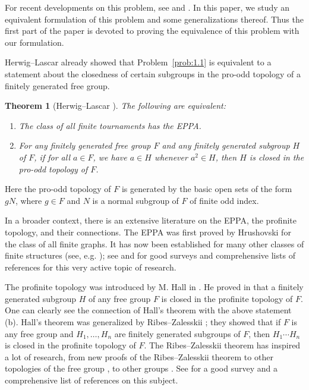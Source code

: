 \documentclass[10pt,a4paper]{amsart}
\newtheorem{theorem}{Theorem}[section]
\theoremstyle{definition}
\theoremstyle{definition}
\numberwithin{equation}{section}
\begin{document}
For recent developments on this problem, see \cite{HPSW19} and \cite{HJKS25}. In this paper, we study an equivalent formulation of this problem and some generalizations thereof. Thus the first part of the paper is devoted to proving the equivalence of this problem with our formulation.

Herwig--Lascar \cite[Section 6]{HL00} already showed that Problem~\ref{prob:1.1} is equivalent to a statement about the closedness of certain subgroups in the pro-odd topology of a finitely generated free group.

\begin{theorem}[Herwig--Lascar \cite{HL00}]\label{thm:HL00} The following are equivalent:
\begin{enumerate}
\item[\rm (a)] The class of all finite tournaments has the EPPA.
\item[\rm (b)] For any finitely generated free group $F$ and any finitely generated subgroup $H$ of $F$, if for all $a\in F$, we have $a\in H$ whenever $a^2\in H$, then $H$ is closed in the pro-odd topology of $F$.
\end{enumerate}
\end{theorem}

Here the pro-odd topology of $F$ is generated by the basic open sets of the form $gN$, where $g\in F$ and $N$ is a normal subgroup of $F$ of finite odd index.

In a broader context, there is an extensive literature on the EPPA, the profinite topology, and their connections. The EPPA was first proved by Hrushovski \cite{Hr92} for the class of all finite graphs. It has now been established for many other classes of finite structures (see, e.g. \cite{He95, HL00, So05, Co19, HPSW19, EHKN20, Ko20, HKN22, HJKS25}); see \cite{HKN22} and \cite{HJKS25} for good surveys and comprehensive lists of references for this very active topic of research. 

The profinite topology was introduced by M. Hall in \cite{Ha49, Ha50}. He proved in \cite[Theorem 5.1]{Ha49} that a finitely generated subgroup $H$ of any free group $F$ is closed in the profinite topology of $F$. One can clearly see the connection of Hall's theorem with the above statement (b). Hall's theorem was generalized by Ribes--Zalesskii \cite{RZ93}; they showed that if $F$ is any free group and $H_1, \dots, H_n$ are finitely generated subgroups of $F$, then $H_1\cdots H_n$ is closed in the profinite topology of $F$. The Ribes--Zalesskii theorem has inspired a lot of research, from new proofs of the Ribes--Zalesskii theorem \cite{AS05, Zh25} to other topologies of the free group \cite{RZ94, AS04, Au17}, to other groups \cite{Yo97, Co01, Mi06,  RZBook, Ro11, MS24, MM25}. See \cite{ABO26} for a good survey and a comprehensive list of references on this subject.
\end{document}

